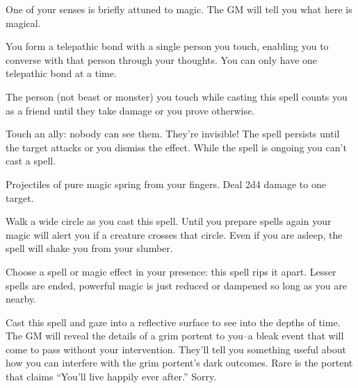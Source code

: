  One of your senses is briefly attuned to magic. The GM will tell you what here is magical.

\newpage
{}



 You form a telepathic bond with a single person you touch, enabling you to converse with that person through your thoughts. You can only have one telepathic bond at a time.





 The person (not beast or monster) you touch while casting this spell counts you as a friend until they take damage or you prove otherwise.





 Touch an ally: nobody can see them. They're invisible! The spell persists until the target attacks or you dismiss the effect. While the spell is ongoing you can't cast a spell.





 Projectiles of pure magic spring from your fingers. Deal 2d4 damage to one target.




 Walk a wide circle as you cast this spell. Until you prepare spells again your magic will alert you if a creature crosses that circle. Even if you are asleep, the spell will shake you from your slumber.




 Choose a spell or magic effect in your presence: this spell rips it apart. Lesser spells are ended, powerful magic is just reduced or dampened so long as you are nearby.





 Cast this spell and gaze into a reflective surface to see into the depths of time. The GM will reveal the details of a grim portent to you--a bleak event that will come to pass without your intervention. They'll tell you something useful about how you can interfere with the grim portent's dark outcomes. Rare is the portent that claims ``You'll live happily ever after.'' Sorry.




